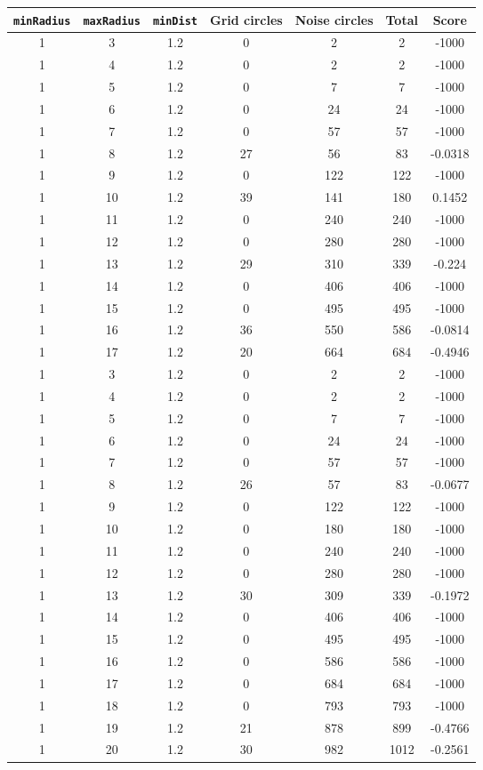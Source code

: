 \documentclass[letterpaper, 12pt]{article}
\begin{document}
\begin{longtable}{|c|c|c|c|c|c|c|}
\hline
\textbf{\texttt{minRadius}} & \textbf{\texttt{maxRadius}} & \textbf{\texttt{minDist}} & \textbf{Grid circles} & \textbf{Noise circles} & \textbf{Total} & \textbf{Score} \\
\hline
1 & 3 & 1.2 & 0 & 2 & 2 & -1000 \\
\hline
1 & 4 & 1.2 & 0 & 2 & 2 & -1000 \\
\hline
1 & 5 & 1.2 & 0 & 7 & 7 & -1000 \\
\hline
1 & 6 & 1.2 & 0 & 24 & 24 & -1000 \\
\hline
1 & 7 & 1.2 & 0 & 57 & 57 & -1000 \\
\hline
1 & 8 & 1.2 & 27 & 56 & 83 & -0.0318 \\
\hline
1 & 9 & 1.2 & 0 & 122 & 122 & -1000 \\
\hline
1 & 10 & 1.2 & 39 & 141 & 180 & 0.1452 \\
\hline
1 & 11 & 1.2 & 0 & 240 & 240 & -1000 \\
\hline
1 & 12 & 1.2 & 0 & 280 & 280 & -1000 \\
\hline
1 & 13 & 1.2 & 29 & 310 & 339 & -0.224 \\
\hline
1 & 14 & 1.2 & 0 & 406 & 406 & -1000 \\
\hline
1 & 15 & 1.2 & 0 & 495 & 495 & -1000 \\
\hline
1 & 16 & 1.2 & 36 & 550 & 586 & -0.0814 \\
\hline
1 & 17 & 1.2 & 20 & 664 & 684 & -0.4946 \\
\hline
1 & 3 & 1.2 & 0 & 2 & 2 & -1000 \\
\hline
1 & 4 & 1.2 & 0 & 2 & 2 & -1000 \\
\hline
1 & 5 & 1.2 & 0 & 7 & 7 & -1000 \\
\hline
1 & 6 & 1.2 & 0 & 24 & 24 & -1000 \\
\hline
1 & 7 & 1.2 & 0 & 57 & 57 & -1000 \\
\hline
1 & 8 & 1.2 & 26 & 57 & 83 & -0.0677 \\
\hline
1 & 9 & 1.2 & 0 & 122 & 122 & -1000 \\
\hline
1 & 10 & 1.2 & 0 & 180 & 180 & -1000 \\
\hline
1 & 11 & 1.2 & 0 & 240 & 240 & -1000 \\
\hline
1 & 12 & 1.2 & 0 & 280 & 280 & -1000 \\
\hline
1 & 13 & 1.2 & 30 & 309 & 339 & -0.1972 \\
\hline
1 & 14 & 1.2 & 0 & 406 & 406 & -1000 \\
\hline
1 & 15 & 1.2 & 0 & 495 & 495 & -1000 \\
\hline
1 & 16 & 1.2 & 0 & 586 & 586 & -1000 \\
\hline
1 & 17 & 1.2 & 0 & 684 & 684 & -1000 \\
\hline
1 & 18 & 1.2 & 0 & 793 & 793 & -1000 \\
\hline
1 & 19 & 1.2 & 21 & 878 & 899 & -0.4766 \\
\hline
1 & 20 & 1.2 & 30 & 982 & 1012 & -0.2561 \\
\hline
\end{longtable}
\end{document}
